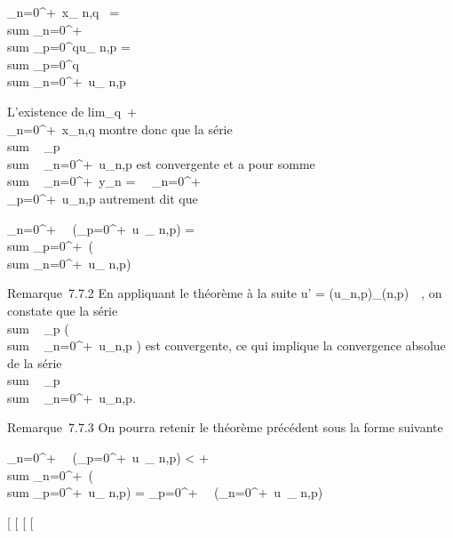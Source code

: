 \documentclass[]{article}
\begin{document}
\sum \_n=0^+\infty~x\_ n,q~ =
\\sum
\_n=0^+\infty~\\sum
\_p=0^qu\_ n,p = \\sum
\_p=0^q \\sum
\_n=0^+\infty~u\_ n,p

L'existence de
lim\_q\rightarrow~+\infty~~\\\sum
 \_n=0^+\infty~x\_n,q montre donc que la série
\\sum ~
\_p \\sum ~
\_n=0^+\infty~u\_n,p est convergente et a pour somme
\\sum ~
\_n=0^+\infty~y\_n =\
\sum ~
\_n=0^+\infty~\\\sum
 \_p=0^+\infty~u\_n,p autrement dit que

\sum \_n=0^+\infty~~\left
(\sum \_p=0^+\infty~u~\_
n,p\right ) = \\sum
\_p=0^+\infty~\left (\\sum
\_n=0^+\infty~u\_ n,p\right )

Remarque~7.7.2 En appliquant le théorème à la suite u' =
(\textbar{}u\_n,p\textbar{})\_(n,p)\in{}~\times{}~, on constate que
la série \\sum ~
\_p\left
(\\sum ~
\_n=0^+\infty~\textbar{}u\_n,p\textbar{}\right
) est convergente, ce qui implique la convergence absolue de la série
\\sum ~
\_p \\sum ~
\_n=0^+\infty~u\_n,p.

Remarque~7.7.3 On pourra retenir le théorème précédent sous la forme
suivante

\sum \_n=0^+\infty~~\left
(\sum \_p=0^+\infty~\textbar{}u~\_
n,p\textbar{}\right ) \textless{}
+\infty~\rigtharrow~\\sum
\_n=0^+\infty~\left (\\sum
\_p=0^+\infty~u\_ n,p\right ) =
\sum \_p=0^+\infty~~\left
(\sum \_n=0^+\infty~u~\_
n,p\right )

{[}
{[}
{[}
{[}
\end{document}
